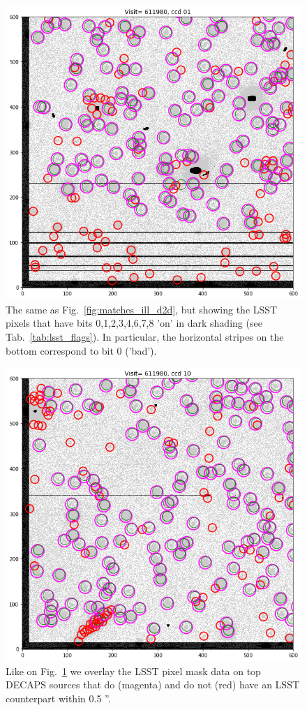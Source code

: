 \documentclass[DM,lsstdraft,toc,usenatbib]{lsstdoc}
\begin{document}
\begin{figure}
\begin{centering}
\includegraphics[width=0.7\columnwidth]{figs/09_visit_611980_ccd0110-24d2d_mask.png}
\caption{The same as Fig.~\ref{fig:matches_ill_d2d}, but showing the LSST pixels that have bits  0,1,2,3,4,6,7,8 'on' in dark shading (see Tab.~\ref{tab:lsst_flags}). In particular, the horizontal stripes on the bottom correspond to bit 0 ('bad').}
\label{fig:matches_ill_d2d_mask}
\end{centering}
\end{figure} 


\begin{figure}
\begin{centering}
\includegraphics[width=0.7\columnwidth]{figs/10_visit_611980_ccd1010-24d2d_mask.png}
\caption{Like on Fig.~\ref{fig:matches_ill_d2d_mask} we overlay the LSST pixel mask data on top DECAPS sources that do (magenta) and do not  (red) have an LSST counterpart within 0.5 ''. }
\label{fig:ccd10_d2d_mask}
\end{centering}
\end{figure} 
\end{document}
